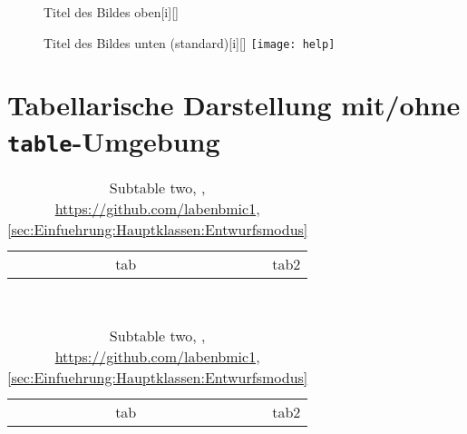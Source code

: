 \lipsum[1-1]%
\begin{figure}
	\begingroup%
	\begin{captionbeside}{Titel des Bildes oben}[i][\linewidth]%
	\end{captionbeside}\label{fig:Gleitumgebungen:Titel des Bildes oben}%
	\endgroup%
\end{figure}
\lipsum[1-1]%
\begin{figure}
	\begin{captionbeside}{Titel des Bildes unten (standard)}[i][\linewidth]%
		\texttt{[image: help]}%
	\end{captionbeside}\label{fig:Gleitumgebungen:Titel des Bildes unten}%
\end{figure}
\lipsum[1-1]%


\chapter{Tabellarische Darstellung mit/ohne \texttt{table}-Umgebung}
\label{chap:Tabellen}
\begin{table}
	\caption{Tabelle mit -subtable ohne -captionsetup (\texttt{komafont}, \cite{LabenbacherTeX})}
	\label{tab:Tabellen:Tabelle mit latex-subtable ohne latex-captionsetup (Standard: komafont)}
	\begin{subtable}[b]{\linewidth}
		\caption{Subtable one}
		\label{subtab:Tabellen:mit latex-subtable:one}
	\begin{tabular}{|r|r|}
		tab & tab2
	\end{tabular}
	\end{subtable}\\
	\begin{subtable}[b]{\linewidth}\centering
		\caption{Subtable two, \cite{LabenbacherTeX}, \url{https://github.com/labenbmic1},  \ref{sec:Einfuehrung:Hauptklassen:Entwurfsmodus}}
		\label{subtab:Tabellen:mit latex-subtable:two}
	\begin{tabular}{|r|r|}
		tab & tab2
	\end{tabular}
	\end{subtable}
\end{table}

